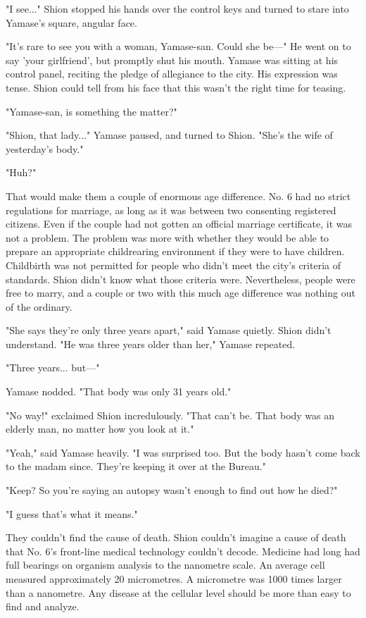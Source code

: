 "I see..." Shion stopped his hands over the control keys and turned to
stare into Yamase's square, angular face.

"It's rare to see you with a woman, Yamase-san. Could she be---" He went
on to say 'your girlfriend', but promptly shut his mouth. Yamase was
sitting at his control panel, reciting the pledge of allegiance to the
city. His expression was tense. Shion could tell from his face that this
wasn't the right time for teasing.

"Yamase-san, is something the matter?"

"Shion, that lady..." Yamase paused, and turned to Shion. "She's the
wife of yesterday's body."

"Huh?"

That would make them a couple of enormous age difference. No. 6 had no
strict regulations for marriage, as long as it was between two
consenting registered citizens. Even if the couple had not gotten an
official marriage certificate, it was not a problem. The problem was
more with whether they would be able to prepare an appropriate
childrearing environment if they were to have children. Childbirth was
not permitted for people who didn't meet the city's criteria of
standards. Shion didn't know what those criteria were. Nevertheless,
people were free to marry, and a couple or two with this much age
difference was nothing out of the ordinary.

"She says they're only three years apart," said Yamase quietly. Shion
didn't understand. "He was three years older than her," Yamase repeated.

"Three years... but---"

Yamase nodded. "That body was only 31 years old."

"No way!" exclaimed Shion incredulously. "That can't be. That body was
an elderly man, no matter how you look at it."

"Yeah," said Yamase heavily. "I was surprised too. But the body hasn't
come back to the madam since. They're keeping it over at the Bureau."

"Keep? So you're saying an autopsy wasn't enough to find out how he
died?"

"I guess that's what it means."

They couldn't find the cause of death. Shion couldn't imagine a cause of
death that No. 6's front-line medical technology couldn't decode.
Medicine had long had full bearings on organism analysis to the
nanometre scale. An average cell measured approximately 20 micrometres.
A micrometre was 1000 times larger than a nanometre. Any disease at the
cellular level should be more than easy to find and analyze.

